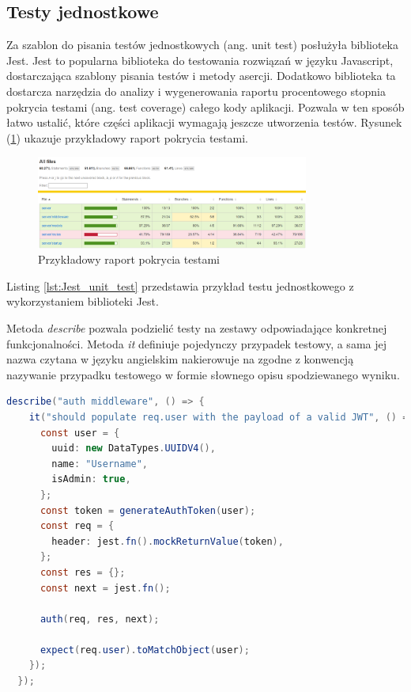 \documentclass{sprz}
\begin{document}
\subsection{Testy jednostkowe}

Za szablon do pisania testów jednostkowych (ang. unit test) posłużyła biblioteka Jest. Jest to popularna biblioteka do testowania rozwiązań w języku Javascript, dostarczająca szablony pisania testów i metody asercji. Dodatkowo biblioteka ta dostarcza narzędzia do analizy i wygenerowania raportu procentowego stopnia pokrycia testami (ang. test coverage) całego kody aplikacji. Pozwala w ten sposób łatwo ustalić, które części aplikacji wymagają jeszcze utworzenia testów. Rysunek (\ref{img:test_coverage}) ukazuje przykładowy raport pokrycia testami.

\begin{figure}[h]
  \centering
  \includegraphics[width=0.8\textwidth]{sprz/test_coverage}
  \caption{Przykładowy raport pokrycia testami}
  \label{img:test_coverage}
\end{figure}

Listing \ref{lst:Jest_unit_test} przedstawia przykład testu jednostkowego z wykorzystaniem biblioteki Jest.

Metoda \textit{describe} pozwala podzielić testy na zestawy odpowiadające konkretnej funkcjonalności. Metoda \textit{it} definiuje pojedynczy przypadek testowy, a sama jej nazwa czytana w języku angielskim nakierowuje na zgodne z konwencją nazywanie przypadku testowego w formie słownego opisu spodziewanego wyniku.

\begin{lstlisting}[language=Java,caption={Test jednostkowy z wykorzystaniem Jest}, label={lst:Jest_unit_test}]
  describe("auth middleware", () => {
    it("should populate req.user with the payload of a valid JWT", () => {
      const user = {
        uuid: new DataTypes.UUIDV4(),
        name: "Username",
        isAdmin: true,
      };
      const token = generateAuthToken(user);
      const req = {
        header: jest.fn().mockReturnValue(token),
      };
      const res = {};
      const next = jest.fn();
  
      auth(req, res, next);
  
      expect(req.user).toMatchObject(user);
    });
  });
\end{lstlisting}
\end{document}
